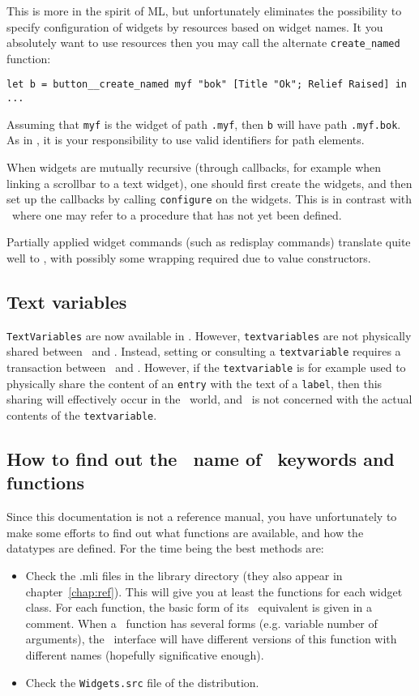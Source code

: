 This is more in the spirit of ML, but unfortunately eliminates the
possibility to specify configuration of widgets by resources based on widget 
names. It you absolutely want to use resources then you may call the
alternate \verb|create_named| function:
\begin{verbatim}
let b = button__create_named myf "bok" [Title "Ok"; Relief Raised] in
...
\end{verbatim} 
Assuming that \verb|myf| is the widget of path \verb|.myf|, then \verb|b|
will have path \verb|.myf.bok|. As in \tk, it is your responsibility to use
valid identifiers for path elements.

When widgets are mutually recursive (through callbacks, for example when
linking a scrollbar to a text widget), one should first create the widgets,
and then set up the callbacks by calling \verb|configure| on the widgets.
This is in contrast with \tcl\tk\ where one may refer to a procedure that
has not yet been defined.

Partially applied widget commands (such as redisplay commands) translate
quite well to \caml, with possibly some wrapping required due to 
value constructors.

\subsection{Text variables}
\verb|TextVariables| are now available in \camltk. However,
\verb|textvariables| are not physically shared between \caml\ and \tk.
Instead, setting or consulting a \verb|textvariable| requires a transaction
between \caml\ and \tk. However, if the \verb|textvariable| is for example
used to physically share the content of an {\tt entry} with the text of a
{\tt label}, then this sharing will effectively occur in the \tk\ world, and
\caml\ is not concerned with the actual contents of the \verb|textvariable|.

\subsection{How to find out the \caml\ name of \tk\ keywords and functions}
Since this documentation is not a reference manual, you have unfortunately
to make some efforts to find out what functions are available, and how the
datatypes are defined. For the time being the best methods are:
\begin{itemize}
\item Check the .mli files in the library directory (they also appear in
chapter~\ref{chap:ref}). This will give you at least the functions for each
widget class. For each function, the basic form of its \tk\ equivalent is
given in a comment. When a \tk\  function has several forms (e.g. variable
number of arguments), the \camltk\ interface will have different versions of
this function with different names (hopefully significative enough).

\item Check the \verb|Widgets.src| file of the distribution. 

\end{itemize} 

